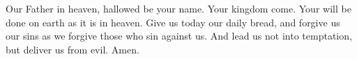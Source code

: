 Our Father in heaven, hallowed be your name. Your kingdom come. Your will be done on earth as it is in heaven. Give us today our daily bread, and forgive us our sins as we forgive those who sin against us. And lead us not into temptation, but deliver us from evil. Amen.
